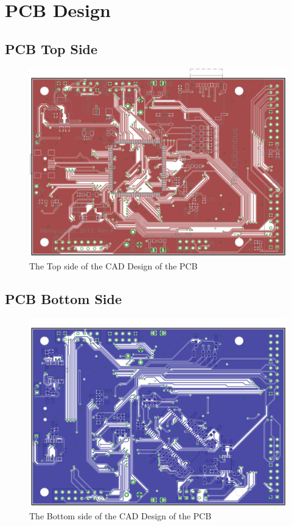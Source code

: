 \chapter{PCB Design} \label{Appendix:PCB}
\section{PCB Top Side}
\begin{figure}[ht!]
\centering
\includegraphics[angle=90,width=\textwidth,height=\textheight-5cm,keepaspectratio]{Figures/ColumbusPCBTop_GP.png} 
\caption{The Top side of the CAD Design of the PCB}
\label{fig:PCB:Eagle:Top}
\end{figure}
\clearpage
\section{PCB Bottom Side}
\begin{figure}[ht!]
\centering
\includegraphics[angle=90,width=\textwidth,height=\textheight-5cm,keepaspectratio]{Figures/ColumbusPCBBottom_GP.png} 
\caption{The Bottom side of the CAD Design of the PCB}
\label{fig:PCB:Eagle:Bottom}
\end{figure}
\clearpage